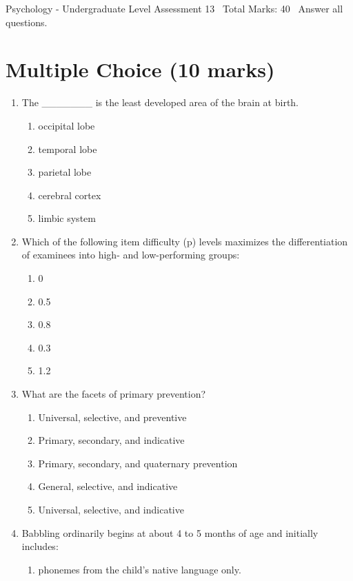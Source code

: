 \documentclass[12pt]{article}
\begin{document}
\begin{center}
Psychology - Undergraduate Level Assessment 13 \
Total Marks: 40 \
Answer all questions.
\end{center}

\section*{Multiple Choice (10 marks)}
\begin{enumerate}[label=\arabic*.]
\item The \_\_\_\_\_\_\_ is the least developed area of the brain at birth.
\begin{enumerate}[label=(\alph*)]
    \item occipital lobe
    \item temporal lobe
    \item parietal lobe
    \item cerebral cortex
    \item limbic system
\end{enumerate}
\item Which of the following item difficulty (p) levels maximizes the differentiation of examinees into high- and low-performing groups:
\begin{enumerate}[label=(\alph*)]
    \item 0
    \item 0.5
    \item 0.8
    \item 0.3
    \item 1.2
\end{enumerate}
\item What are the facets of primary prevention?
\begin{enumerate}[label=(\alph*)]
    \item Universal, selective, and preventive
    \item Primary, secondary, and indicative
    \item Primary, secondary, and quaternary prevention
    \item General, selective, and indicative
    \item Universal, selective, and indicative
\end{enumerate}
\item Babbling ordinarily begins at about 4 to 5 months of age and initially includes:
\begin{enumerate}[label=(\alph*)]
    \item phonemes from the child's native language only.

\end{enumerate}
\end{enumerate}
\end{document}

